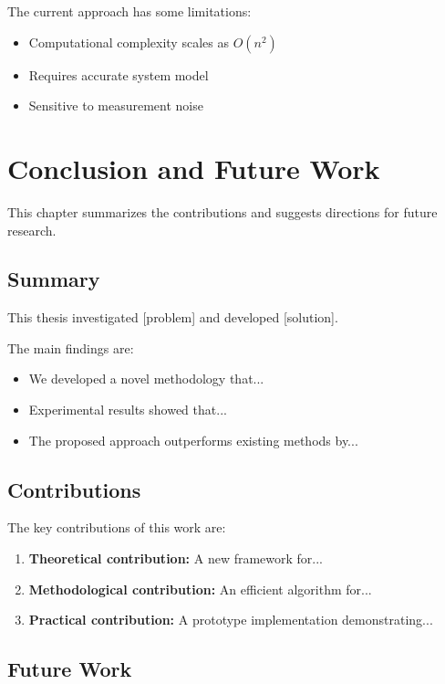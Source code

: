 \documentclass[11pt,a4paper,twoside,openright]{book}
\begin{document}
The current approach has some limitations:
\begin{itemize}
    \item Computational complexity scales as $O(n^2)$
    \item Requires accurate system model
    \item Sensitive to measurement noise
\end{itemize}

\chapter{Conclusion and Future Work}
\label{ch:conclusion}

This chapter summarizes the contributions and suggests directions for future research.

\section{Summary}

This thesis investigated [problem] and developed [solution].

The main findings are:
\begin{itemize}
    \item We developed a novel methodology that...
    \item Experimental results showed that...
    \item The proposed approach outperforms existing methods by...
\end{itemize}

\section{Contributions}

The key contributions of this work are:
\begin{enumerate}
    \item \textbf{Theoretical contribution:} A new framework for...
    \item \textbf{Methodological contribution:} An efficient algorithm for...
    \item \textbf{Practical contribution:} A prototype implementation demonstrating...
\end{enumerate}

\section{Future Work}
\end{document}
